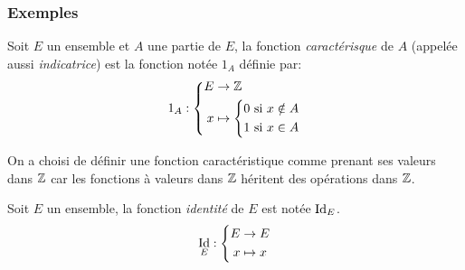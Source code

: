 \subsubsection{Exemples}
\begin{defi}
Soit $E$ un ensemble et $A$ une partie de $E$, la fonction \emph{caractérisque} de $A$ (appelée aussi \emph{indicatrice}) est la fonction notée $1_A$ définie par:
\begin{displaymath}
 1_A :
\left\lbrace 
\begin{aligned}
    E &\rightarrow \mathbb{Z} \\
    x &\mapsto
        \left\lbrace 
            \begin{aligned}
                0 &\text{ si } x\notin A \\
                1 &\text{ si } x\in A
            \end{aligned}
        \right. 
\end{aligned}
\right. 
\end{displaymath}
\end{defi}
\begin{rem}
 On a choisi de définir une fonction caractéristique comme prenant ses valeurs dans $\mathbb{Z}$ car les fonctions à valeurs dans $\mathbb{Z}$ héritent des opérations dans $\mathbb{Z}$.
\end{rem}

\begin{defi}
 Soit $E$ un ensemble, la fonction \emph{identité} de $E$ est notée $\mathop{\mathrm{Id}}_E$. 
\begin{displaymath}
 \mathop{\mathrm{Id}}_E:
\left\lbrace 
\begin{aligned}
 E &\rightarrow E \\ x &\mapsto x
\end{aligned}
\right. 
\end{displaymath}
\end{defi}

